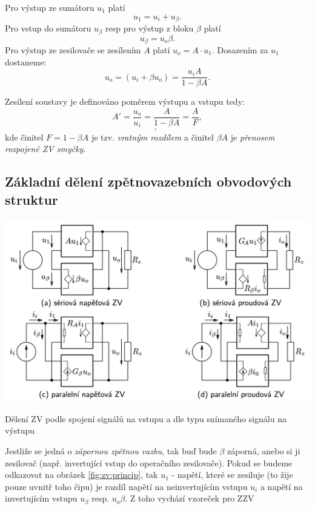 \documentclass[a4paper,12pt]{article}   %
\begin{document}
Pro výstup ze sumátoru $u_\text{1}$ platí
\begin{equation*}
    u_\text{1} = u_i + u_\beta.
\end{equation*}
Pro vstup do sumátoru $u_\beta$ resp pro výstup z bloku $\beta$ platí
\begin{equation*}
    u_\beta = u_o \beta.
\end{equation*}
Pro výstup ze zesilovače se zesílením $A$ platí $u_o = A\cdot u_\text{1}$. Dosazením za $u_\text{1}$ dostaneme:
\begin{equation*}
    u_o = (u_i + \beta u_o) = \frac{u_i A}{1-\beta A}.
\end{equation*}

Zesílení soustavy je definováno poměrem výstupu a vstupu tedy:
\begin{equation}
    \underline{\underline{A' = \frac{u_o}{u_i} = \frac{A}{1-\beta A} = \frac{A}{F}}},
\end{equation}
kde činitel $F = 1-\beta A$ je tzv. \textit{vratným rozdílem} a činitel $\beta A$ je \textit{přenosem rozpojené ZV smyčky}. 

\subsection{Základní dělení zpětnovazebních obvodových struktur}

\begin{schema}[h!]
    \centering
    \includegraphics[width=.8\textwidth]{ZV-obvody.png}
    \caption{Dělení ZV podle spojení signálů na vstupu a dle typu snímaného signálu na výstupu}
    \label{fig:ZV:deleni}
\end{schema}


Jestliže se jedná o \textit{zápornou zpětnou vazbu}, tak buď bude $\beta$ záporná, anebo si ji  zesilovač (např. invertující vstup do operačního zesilovače). Pokud se budeme odkazovat na obrázek \ref{fig:zv:princip}, tak $u_1$ - napětí, které se zesiluje (to žije pouze uvnitř toho čipu) je rozdíl napětí na neinvertujícím vstupu $u_i$ a napětí na invertujícím vstupu $u_\beta$ resp. $u_o\beta$. Z toho vychází vzoreček pro ZZV
\end{document}

